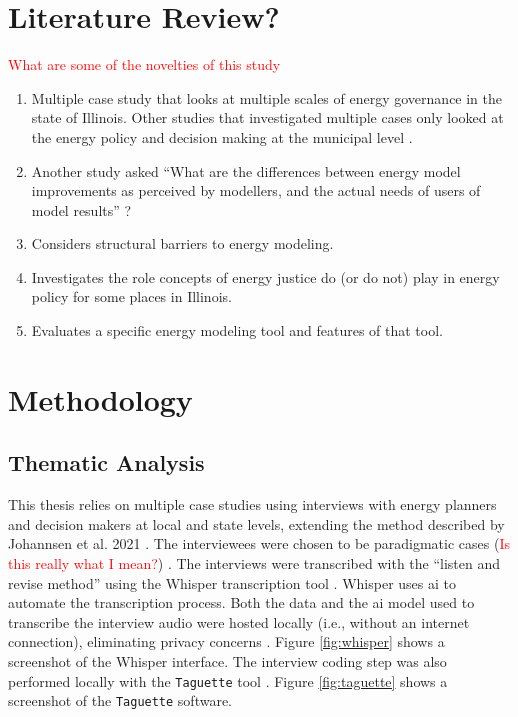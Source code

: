 \section{Literature Review?}

\textcolor{red}{What are some of the novelties of this study}
\begin{enumerate}
    \item Multiple case study that looks at multiple scales of energy governance
    in the state of Illinois. Other studies that investigated multiple cases
    only looked at the energy policy and decision making at the municipal level
    \cite{johannsen_designing_2021, ben_amer_too_2020}.
    \item Another study asked ``What are the differences between energy model
    improvements as perceived by modellers, and the actual needs of users of
    model results'' \cite{susser_better_2022}?
    \item Considers structural barriers to energy modeling.
    \item Investigates the role concepts of energy justice do (or do not) play
    in energy policy for some places in Illinois.
    \item Evaluates a specific energy modeling tool and features of that tool.
\end{enumerate}

\section{Methodology}
\label{section:interview-methods}

\subsection{Thematic Analysis}
This thesis relies on multiple case studies using interviews with energy
planners and decision makers at local and state levels, extending the method
described by Johannsen et al. 2021 \cite{johannsen_designing_2021}. The
interviewees were chosen to be paradigmatic cases (\textcolor{red}{Is this
really what I mean?}) \cite{flyvbjerg_five_2006}. The interviews were
transcribed with the ``listen and revise method'' using the Whisper
transcription tool \cite{battaglia_listen_2024}. Whisper uses \ac{ai} to
automate the transcription process. Both the data and the \ac{ai} model used to
transcribe the interview audio were hosted locally (i.e., without an internet
connection), eliminating privacy concerns \cite{battaglia_listen_2024}. Figure
\ref{fig:whisper} shows a screenshot of the Whisper interface. The interview
coding step was also performed locally with the \texttt{Taguette} tool
\cite{rampin_taguette_2021}. Figure \ref{fig:taguette} shows a screenshot of the
\texttt{Taguette} software.


